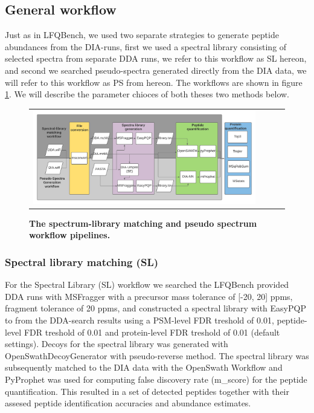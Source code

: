 \documentclass[10pt,letterpaper]{article}
\begin{document}
\subsection*{General workflow}

Just as in LFQBench, we used two separate strategies to generate peptide abundances from the DIA-runs, first we used a spectral library consisting of selected spectra from separate DDA runs, we refer to this workflow as SL hereon, and second we searched pseudo-spectra generated directly from the DIA data, we will refer to this workflow as PS from hereon. The workflows are shown in figure \ref{fig:flowchart}. We will describe the parameter chioces of both theses two methods below.

\begin{figure}[htp]
    \centering
    \begin{tabular}{lclc} 


        \includegraphics[width=1.1\linewidth]{../../result/report_plots/DIA_benchmark_flowchart_color} 
    \end{tabular}

        \caption{{\bf The spectrum-library matching and pseudo spectrum workflow pipelines.}}
      \label{fig:flowchart}
\end{figure}



\subsubsection*{Spectral library matching (SL)}

For the Spectral Library (SL) workflow we searched the LFQBench provided DDA runs with MSFragger\cite{kong2017msfragger} with a precursor mass tolerance of [-20, 20] ppms, fragment tolerance of 20 ppms, and constructed a spectral library with EasyPQP \cite{easypqp} to from the DDA-search results using a PSM-level FDR treshold of 0.01, peptide-level FDR treshold of 0.01 and protein-level FDR treshold of 0.01 (default settings). Decoys for the spectral library was generated with OpenSwathDecoyGenerator with pseudo-reverse method. The spectral library was subsequently matched to the DIA data with the OpenSwath Workflow and  PyProphet\cite{teleman2015diana} was used for computing false discovery rate (m\_score) for the peptide quantification. This resulted in a set of detected peptides together with their assesed peptide identification accuracies and abundance estimates.
\end{document}
